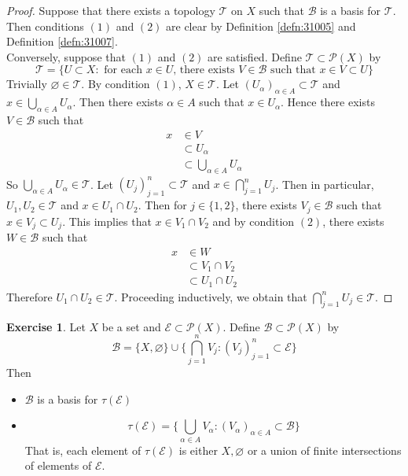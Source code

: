 \documentclass[12pt]{amsart}
\theoremstyle{definition}
\newtheorem{ex}[definition]{Exercise}
\newcommand{\al}{\alpha}
\newcommand{\MB}{\mathcal{B}}
\newcommand{\MP}{\mathcal{P}}
\newcommand{\ME}{\mathcal{E}}
\newcommand{\MT}{\mathcal{T}}
\newcommand{\lex}[1]{\label{ex:#1}}
\newcommand{\rd}[1]{Definition \ref{defn:#1}}
\begin{document}
	\begin{proof}
	Suppose that there exists a topology $\MT$ on $X$ such that $\MB$ is a basis for $\MT$. Then conditions $(1)$ and $(2)$ are clear by \rd{31005} and \rd{31007}. \\
	Conversely, suppose that $(1)$ and $(2)$ are satisfied. Define $\MT \subset \MP(X)$ by 
	$$\MT =  \{ U \subset X: \text{ for each $x \in U$, there exists $V \in \MB$ such that $x \in V \subset U$} \}$$
	Trivially $\varnothing \in \MT$. By condition $(1)$, $X \in \MT$. Let $(U_{\al})_{\al \in A} \subset \MT$ and $x \in \bigcup\limits_{\al \in A}U_{\al}$. Then there exists $\al \in A$ such that $x \in U_{\al}$. Hence there exists $V \in \MB$ such that 
	\begin{align*}
	x 
	& \in V \\
	& \subset U_{\al} \\
	& \subset \bigcup\limits_{\al \in A}U_{\al}
	\end{align*}
	So $\bigcup\limits_{\al \in A}U_{\al} \in \MT$. Let $(U_j)_{j=1}^n \subset \MT$ and $x \in \bigcap\limits_{j=1}^n U_j$. Then in particular, $U_1, U_2 \in \MT$ and $x \in  U_1 \cap U_2$. Then for $j \in \{1, 2\}$, there exists $V_j \in \MB$ such that $x \in V_j \subset U_j$. This implies that $x \in V_1 \cap V_2$ and by condition $(2)$, there exists $W \in \MB$ such that
	\begin{align*}
	x 
	& \in W \\
	& \subset V_1 \cap V_2 \\
	& \subset U_1 \cap U_2
	\end{align*}
	Therefore $U_1 \cap U_2 \in \MT$. Proceeding inductively, we obtain that $\bigcap\limits_{j=1}^n U_j \in \MT$.
	\end{proof}
	
	\begin{ex} \lex{31010}
	Let $X$ be a set and $\ME \subset \MP(X)$. Define $\MB \subset \MP(X)$ by 
	$$\MB = \{X, \varnothing\} \cup  \bigg \{\bigcap_{j=1}^n V_j: (V_j)_{j=1}^n \subset \ME \bigg \}$$ 
	Then 
	\begin{itemize}
	\item $\MB$ is a basis for $\tau(\ME)$ 
	\item $$\tau(\ME) = \bigg \{ \bigcup_{\al \in A} V_{\al}: (V_{\al})_{\al \in A} \subset \MB \bigg \}$$ That is, each element of $\tau(\ME)$ is either $X, \varnothing$ or a union of finite intersections of elements of $\ME$. 
	\end{itemize}
	
	\end{ex}
	
\end{document}
